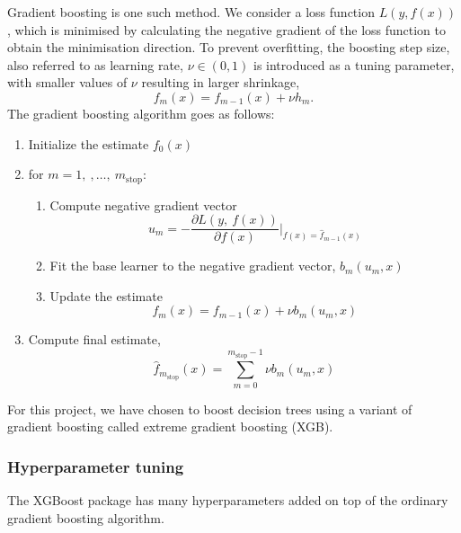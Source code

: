 \documentclass[a4paper, 11pt, twocolumn]{article}
\begin{document}
Gradient boosting is one such method. We consider a loss function $L(y, f(x))$,
which is minimised by calculating the negative gradient of the loss
function to obtain the minimisation direction. To prevent overfitting, the
boosting step size, also referred to as learning rate, $\nu \in (0,1)$ is 
introduced as a tuning parameter, with smaller values of $\nu$ resulting in 
larger shrinkage, 
\begin{equation}
f_m(x)=f_{m-1}(x) + \nu h_m .
\end{equation}
The gradient boosting algorithm goes as follows: \cite{RiccardoGB}
\begin{enumerate}[leftmargin=5mm, itemsep=0pt,  parsep=1pt]
\item Initialize the estimate $f_0(x)$
\item for $m= 1,\ ,\dots,\ m_\text{stop}$:
      \begin{enumerate}[leftmargin=5mm, itemsep=0pt,  parsep=1pt]
            \item Compute negative gradient vector
            \begin{equation*}
                  u_m = -\frac{\partial L(y,\ f(x))}{\partial f(x)} \bigg\vert
                  _{f(x)=\hat{f}_{m-1}(x)}
            \end{equation*}
            \item Fit the base learner to the negative gradient vector,
            $b_m(u_m, x)$
            \item Update the estimate
            \begin{equation*}
                  f_m(x) = f_{m-1}(x) + \nu b_m (u_m, x)
            \end{equation*}
      \end{enumerate}
\item Compute final estimate,
      \begin{equation*}
            \hat{f}_{m_\text{stop}} (x) =
            \sum _{m=0}^{m_\text{stop}-1}\nu b_m(u_m, x)
      \end{equation*}
\end{enumerate}

For this project, we have chosen to boost decision trees using a variant of
gradient boosting called extreme gradient boosting (XGB).


\subsubsection{Hyperparameter tuning}
The XGBoost package has many hyperparameters added on top of the ordinary 
gradient boosting algorithm. 
\end{document}

